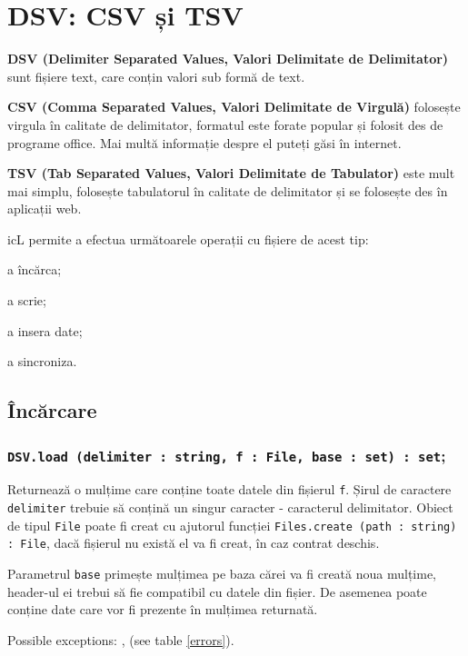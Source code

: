 \section{DSV: CSV și TSV}

{\bf DSV (Delimiter Separated Values, Valori Delimitate de Delimitator)} sunt fișiere text, care conțin valori sub formă de text.

{\bf CSV (Comma Separated Values, Valori Delimitate de Virgulă)} folosește virgula în calitate de delimitator, formatul este forate popular și folosit des de programe office. Mai multă informație despre el puteți găsi în internet.

{\bf TSV (Tab Separated Values, Valori Delimitate de Tabulator)} este mult mai simplu, folosește tabulatorul în calitate de delimitator și se folosește des în aplicații web.

icL permite a efectua următoarele operații cu fișiere de acest tip:
\begin{icItems}
	\item a încărca;
	\item a scrie;
	\item a insera date;
	\item a sincroniza.
\end{icItems}

\subsection{Încărcare}

\subsubsection{\texttt{DSV.load (delimiter : string, f : File, base : set) : set};}

Returnează o mulțime care conține toate datele din fișierul \texttt{f}. Șirul de caractere \texttt{delimiter} trebuie să conțină un singur caracter - caracterul delimitator. Obiect de tipul \texttt{File} poate fi creat cu ajutorul funcției \texttt{Files.create (path : string) : File}, dacă fișierul nu există el va fi creat, în caz contrat deschis.

Parametrul \texttt{base} primește mulțimea pe baza cărei va fi creată noua mulțime, header-ul ei trebui să fie compatibil cu datele din fișier. De asemenea poate conține date care vor fi prezente în mulțimea returnată.

Possible exceptions: ,  (see table \ref{errors}).

